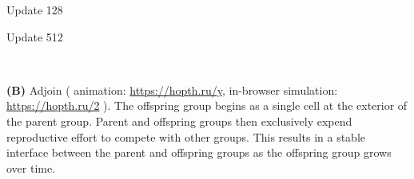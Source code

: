 \begin{figure*}[!htbp]
\begin{center}
\begin{minipage}[b]{\textwidth}
\begin{minipage}[t]{0.18\textwidth}
{\footnotesize Update 128}
\end{minipage}
\begin{minipage}[t]{0.18\textwidth}
\centering
{}
{\footnotesize Update 512}
\end{minipage}\\
\begin{minipage}{\textwidth}
\textbf{(B)} Adjoin
(%
animation: \url{https://hopth.ru/y},
in-browser simulation: \url{https://hopth.ru/2}%
).
The offspring group begins as a single cell at the exterior of the parent group.
Parent and offspring groups then exclusively expend reproductive effort to compete with other groups.
This results in a stable interface between the parent and offspring groups as the offspring group grows over time.
\end{minipage}
\end{minipage}

\vspace{3ex}


\end{center}
\end{figure*}
